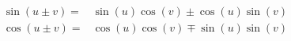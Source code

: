 \documentclass[a4paper, 12pt]{article}
\begin{document}
\begin{align*}
\sin(u \pm v) =& \sin(u) \cos(v) \pm \cos(u) \sin(v) \\
\cos(u \pm v) =& \cos(u) \cos(v) \mp \sin(u) \sin(v)
\end{align*}
\end{document}
